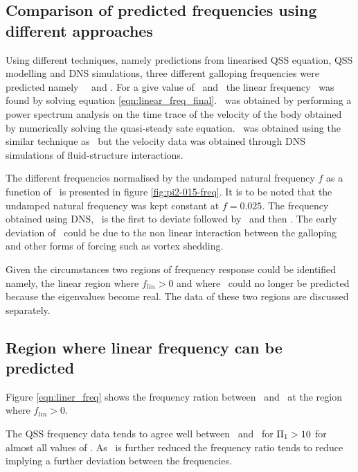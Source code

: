 \subsection{Comparison of predicted frequencies using different approaches}

Using different techniques, namely predictions from linearised QSS equation, QSS modelling and DNS simulations, three different galloping frequencies were predicted namely \freqlin\ \freqqss\ and \freqdns. For a give value of \massstiff\ and \massdamp\, the linear frequency \freqlin\ was found by solving equation \ref{eqn:linear_freq_final}. \freqqss\ was obtained by performing a power spectrum analysis on the time trace of the velocity of the body  obtained by numerically solving the quasi-steady sate equation. \freqdns\ was obtained using the similar technique as \freqqss\ but the velocity data was obtained through DNS simulations of fluid-structure interactions. 



The different frequencies normalised by the undamped natural frequency $f$ as a function of \massstiff\ is presented in figure \ref{fig:pi2-015-freq}. It is to be noted that the undamped natural frequency was kept constant at $f=0.025$. The frequency obtained using DNS, \freqdns\ is the first to deviate followed by \freqqss\ and then \freqlin. The early deviation of \freqdns\ could be due to the non linear interaction between the galloping and other forms of forcing such as vortex shedding.

Given the circumstances two regions of frequency response could be identified namely, the linear region where  $f_{lin}>0$ and where \freqlin\ could no longer be predicted because the eigenvalues become real. The data of these two regions are discussed separately.

\subsection{Region where linear frequency can be predicted}

Figure \ref{eqn:liner_freq} shows the frequency ration between \freqlin\ and \freqqss\ at the region where $f_{lin}>0$. 


The QSS frequency data tends to agree well between \freqlin\ and \freqqss\ for $\Pi_1>10$ for almost all values of \massdamp. As \massstiff\ is further reduced the frequency ratio tends to reduce implying a further deviation between the frequencies.   


